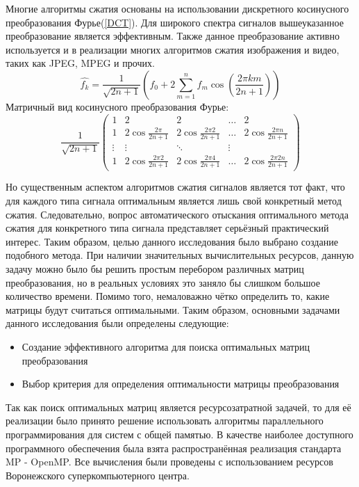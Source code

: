 \documentclass[11pt, oneside, a4paper]{article}
\begin{document}
Многие алгоритмы сжатия основаны на использовании дискретного косинусного преобразования Фурье(\ref{DCT}). Для широкого спектра сигналов вышеуказанное преобразование является эффективным. Также данное преобразование активно используется и в реализации многих алгоритмов сжатия изображения и видео, таких как JPEG, MPEG и прочих.
\begin{equation}
\label{DCT}
\hat{f_k}=\frac{1}{\sqrt{2n+1}}(f_0+2\sum\limits_{m=1}^{n}f_m\cos(\frac{2 \pi k m}{2n+1}))
\end{equation}
Матричный вид косинусного преобразования Фурье:
$$\frac{1}{\sqrt{2n+1}}\begin{pmatrix}
1 & 2 & 2 & \ldots & 2\\
1 & 2\cos\frac{2 \pi}{2n+1} & 2\cos\frac{2 \pi 2}{2n+1} & \ldots & 2\cos\frac{2 \pi n}{2n+1}\\
\vdots & \vdots & \ddots & \vdots\\
1 & 2\cos\frac{2 \pi 2}{2n+1} & 2\cos\frac{2 \pi 4}{2n+1} & \ldots & 2\cos\frac{2 \pi 2n}{2n+1}
\end{pmatrix}$$

Но существенным аспектом алгоритмов сжатия сигналов является тот факт, что для каждого типа сигнала оптимальным является лишь свой конкретный метод сжатия. Следовательно, вопрос автоматического отыскания оптимального метода сжатия для конкретного типа сигнала представляет серьёзный практический интерес. Таким образом, целью данного исследования было выбрано создание подобного метода. При наличии значительных вычислительных ресурсов, данную задачу можно было бы решить простым перебором различных матриц преобразования, но в реальных условиях это заняло бы слишком большое количество времени. Помимо того, немаловажно чётко определить то, какие матрицы будут считаться оптимальными. Таким образом, основными задачами данного исследования были определены следующие:
\begin{itemize}
\item Создание эффективного алгоритма для поиска оптимальных матриц преобразования
\item Выбор критерия для определения оптимальности матрицы преобразования
\end{itemize}
	
Так как поиск оптимальных матриц является ресурсозатратной задачей, то для её реализации было принято решение использовать алгоритмы параллельного программирования для систем с общей памятью. В качестве наиболее доступного программного обеспечения была взята распространённая реализация стандарта MP - OpenMP. Все вычисления были проведены с использованием ресурсов Воронежского суперкомпьютерного центра.
\end{document}
